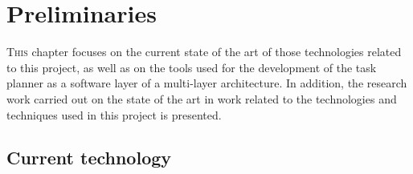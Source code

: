\chapter{Preliminaries}
\label{ch:Preliminaries}
\lettrine[lraise=-0.1, lines=2, loversize=0.2]{T}{his} chapter focuses on the current state of the art of those technologies related to this project, as well as on the tools used for the development of the task planner as a software layer of a multi-layer architecture. In addition, the research work carried out on the state of the art in work related to the technologies and techniques used in this project is presented. 

\section{Current technology}
\label{sec:CurrentTechnology}




